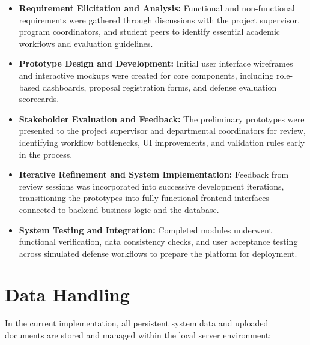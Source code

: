\begin{itemize}
  \item \textbf{Requirement Elicitation and Analysis:} Functional and non-functional requirements were gathered through discussions with the project supervisor, program coordinators, and student peers to identify essential academic workflows and evaluation guidelines.
  
  \item \textbf{Prototype Design and Development:} Initial user interface wireframes and interactive mockups were created for core components, including role-based dashboards, proposal registration forms, and defense evaluation scorecards.
  
  \item \textbf{Stakeholder Evaluation and Feedback:} The preliminary prototypes were presented to the project supervisor and departmental coordinators for review, identifying workflow bottlenecks, UI improvements, and validation rules early in the process.
  
  \item \textbf{Iterative Refinement and System Implementation:} Feedback from review sessions was incorporated into successive development iterations, transitioning the prototypes into fully functional frontend interfaces connected to backend business logic and the database.
  
  \item \textbf{System Testing and Integration:} Completed modules underwent functional verification, data consistency checks, and user acceptance testing across simulated defense workflows to prepare the platform for deployment.
\end{itemize}

\section{Data Handling}
In the current implementation, all persistent system data and uploaded documents are stored and managed within the local server environment:

